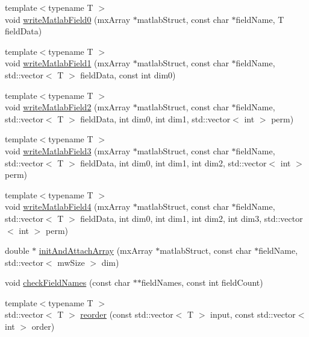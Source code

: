 \begin{DoxyCompactItemize}
\item 
{\footnotesize template$<$typename T $>$ }\\void \mbox{\hyperlink{namespaceamici_ad2949f3931c6fac6fd12fd7ede47ac30}{write\+Matlab\+Field0}} (mx\+Array $\ast$matlab\+Struct, const char $\ast$field\+Name, T field\+Data)
\item 
{\footnotesize template$<$typename T $>$ }\\void \mbox{\hyperlink{namespaceamici_af4c7cca154fe6e21e8854e1308f1bef7}{write\+Matlab\+Field1}} (mx\+Array $\ast$matlab\+Struct, const char $\ast$field\+Name, std\+::vector$<$ T $>$ field\+Data, const int dim0)
\item 
{\footnotesize template$<$typename T $>$ }\\void \mbox{\hyperlink{namespaceamici_a0a2748c0e1bf95de52a2e2cf3450584e}{write\+Matlab\+Field2}} (mx\+Array $\ast$matlab\+Struct, const char $\ast$field\+Name, std\+::vector$<$ T $>$ field\+Data, int dim0, int dim1, std\+::vector$<$ int $>$ perm)
\item 
{\footnotesize template$<$typename T $>$ }\\void \mbox{\hyperlink{namespaceamici_ae2abb9d1f5b8350ced2799fc10f83ec7}{write\+Matlab\+Field3}} (mx\+Array $\ast$matlab\+Struct, const char $\ast$field\+Name, std\+::vector$<$ T $>$ field\+Data, int dim0, int dim1, int dim2, std\+::vector$<$ int $>$ perm)
\item 
{\footnotesize template$<$typename T $>$ }\\void \mbox{\hyperlink{namespaceamici_a234b1006ff3799742ade304a46ed4965}{write\+Matlab\+Field4}} (mx\+Array $\ast$matlab\+Struct, const char $\ast$field\+Name, std\+::vector$<$ T $>$ field\+Data, int dim0, int dim1, int dim2, int dim3, std\+::vector$<$ int $>$ perm)
\item 
double $\ast$ \mbox{\hyperlink{namespaceamici_a10c4b68cefb537f43f52c1f2f23db5f9}{init\+And\+Attach\+Array}} (mx\+Array $\ast$matlab\+Struct, const char $\ast$field\+Name, std\+::vector$<$ mw\+Size $>$ dim)
\item 
void \mbox{\hyperlink{namespaceamici_ad34a0a8f0a3d44e86371a2ecb5841c09}{check\+Field\+Names}} (const char $\ast$$\ast$field\+Names, const int field\+Count)
\item 
{\footnotesize template$<$typename T $>$ }\\std\+::vector$<$ T $>$ \mbox{\hyperlink{namespaceamici_ac6d55e052cd87c2cbd7a5a26e8d11628}{reorder}} (const std\+::vector$<$ T $>$ input, const std\+::vector$<$ int $>$ order)
\item 
$$
\end{DoxyCompactItemize}
